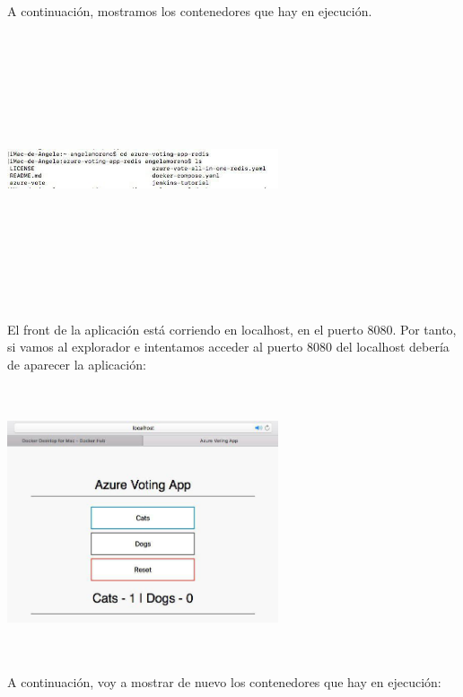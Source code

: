 \documentclass[english,runningheads,a4paper]{llncs}[2018/03/10]
\newenvironment{nscenter}
 {\parskip=0pt\par\nopagebreak\centering}
 {\par\noindent\ignorespacesafterend}
\begin{document}
\newline
A continuación, mostramos los contenedores que hay en ejecución.
\newline
\begin{nscenter}
\includegraphics[width=8cm,height=8cm,keepaspectratio]{./Contenedores/Azure/12.png}
\end{nscenter}
\newline
El front de la aplicación está corriendo en localhost, en el puerto 8080. Por 
tanto, si vamos al explorador e intentamos acceder al puerto 8080 del localhost 
debería de aparecer la aplicación:
\newline
\begin{nscenter}
\includegraphics[width=8cm,height=8cm,keepaspectratio]{./Contenedores/Azure/13.png}
\end{nscenter}
\newline
A continuación, voy a mostrar de nuevo los contenedores que hay en ejecución:
\newline
\end{document}
